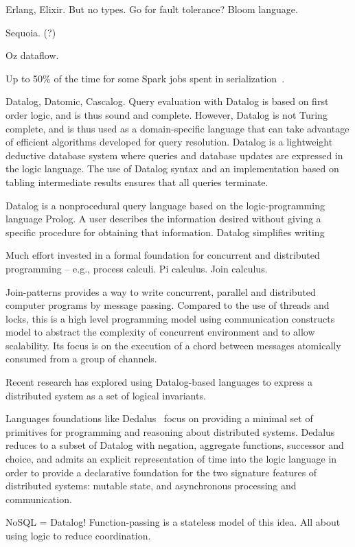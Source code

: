 Erlang, Elixir. But no types. Go for fault tolerance? Bloom language.

Sequoia. (?)

Oz dataflow.

Up to 50\% of the time for some Spark jobs spent in
serialization~\cite{OusterhoutSerialization}.

Datalog, Datomic, Cascalog. Query evaluation with Datalog is based on first
order logic, and is thus sound and complete. However, Datalog is not Turing
complete, and is thus used as a domain-specific language that can take advantage
of efficient algorithms developed for query resolution. Datalog is a lightweight
deductive database system where queries and database updates are expressed in
the logic language. The use of Datalog syntax and an implementation based on
tabling intermediate results ensures that all queries terminate.

Datalog is a nonprocedural query language based on the logic-programming
language Prolog.  A user describes the information desired without giving a
specific procedure for obtaining that information. Datalog simplifies writing

Much effort invested in a formal foundation for concurrent and distributed
programming -- e.g., process calculi. Pi calculus. Join calculus.

Join-patterns provides a way to write concurrent, parallel and distributed
computer programs by message passing. Compared to the use of threads and locks,
this is a high level programming model using communication constructs model to
abstract the complexity of concurrent environment and to allow scalability. Its
focus is on the execution of a chord between messages atomically consumed from a
group of channels.

Recent research has explored using Datalog-based languages to express a
distributed system as a set of logical invariants.

Languages foundations like Dedalus~\cite{Dedalus} focus on providing a minimal set of
primitives for programming and reasoning about distributed systems. Dedalus
reduces to a subset of Datalog with negation, aggregate functions,
successor and choice, and admits an explicit representation of time into the
logic language in order to provide a declarative foundation for the two
signature features of distributed systems: mutable state, and asynchronous
processing and communication.

NoSQL = Datalog! Function-passing is a stateless model of this idea. All about
using logic to reduce coordination.

